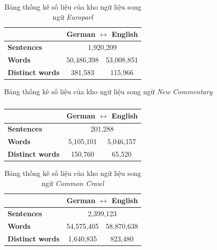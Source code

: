 \begin{table}[H]
	\centering
    \caption{Bảng thống kê số liệu của kho ngữ liệu song ngữ \textit{Europarl}}
    \label{tab:Europarl}
	\begin{tabular}{l|cc|}
	\cline{2-3}
		& \multicolumn{2}{c|}{\textbf{German $\leftrightarrow$ English}} \\ \hline
		\multicolumn{1}{|l|}{\textbf{Sentences}} & \multicolumn{2}{c|}{1,920,209} \\ \hline
		\multicolumn{1}{|l|}{\textbf{Words}}          & \multicolumn{1}{c|}{50,486,398} & 53,008,851 \\ \hline
		\multicolumn{1}{|l|}{\textbf{Distinct words}} & \multicolumn{1}{c|}{381,583} & 115,966 \\ \hline
	\end{tabular}
\end{table}

\begin{table}[H]
	\centering
	\centering
    \caption{Bảng thống kê số liệu của kho ngữ liệu song ngữ \textit{New Commentary}}
   \caption{}
    \label{tab:New Commentary}
	\begin{tabular}{l|cc|}
		\cline{2-3}
		& \multicolumn{2}{c|}{\textbf{German $\leftrightarrow$ English}} \\ \hline
		\multicolumn{1}{|l|}{\textbf{Sentences}}      & \multicolumn{2}{c|}{201,288}                  \\ \hline
		\multicolumn{1}{|l|}{\textbf{Words}}          & \multicolumn{1}{c|}{5,105,101}   & 5,046,157  \\ \hline
		\multicolumn{1}{|l|}{\textbf{Distinct words}} & \multicolumn{1}{c|}{150,760}     & 65,520     \\ \hline
	\end{tabular}
\end{table}

\begin{table}[H]
	\centering
    \caption{Bảng thống kê số liệu của kho ngữ liệu song ngữ \textit{Common Crawl}}
    \label{tab:Common Crawl}
	\begin{tabular}{l|cc|}
	\cline{2-3}
	& \multicolumn{2}{c|}{\textbf{German $\leftrightarrow$ English}} \\ \hline
	\multicolumn{1}{|l|}{\textbf{Sentences}}      & \multicolumn{2}{c|}{2,399,123}               \\ \hline
	\multicolumn{1}{|l|}{\textbf{Words}}          & \multicolumn{1}{c|}{54,575,405} & 58,870,638 \\ \hline
	\multicolumn{1}{|l|}{\textbf{Distinct words}} & \multicolumn{1}{c|}{1,640,835}  & 823,480    \\ \hline
	\end{tabular}
\end{table}

